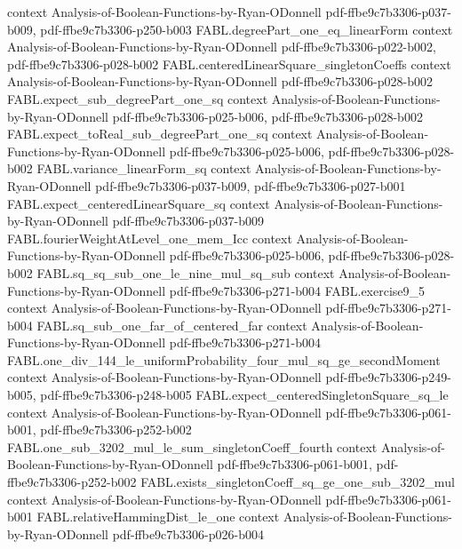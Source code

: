 \begin{theorem}
  {context}
  {Analysis-of-Boolean-Functions-by-Ryan-ODonnell}
  {pdf-ffbe9c7b3306-p037-b009,
    pdf-ffbe9c7b3306-p250-b003}
\proofstep
  {FABL.degreePart_one_eq_linearForm}
  {context}
  {Analysis-of-Boolean-Functions-by-Ryan-ODonnell}
  {pdf-ffbe9c7b3306-p022-b002,
    pdf-ffbe9c7b3306-p028-b002}
\proofstep
  {FABL.centeredLinearSquare_singletonCoeffs}
  {context}
  {Analysis-of-Boolean-Functions-by-Ryan-ODonnell}
  {pdf-ffbe9c7b3306-p028-b002}
\proofstep
  {FABL.expect_sub_degreePart_one_sq}
  {context}
  {Analysis-of-Boolean-Functions-by-Ryan-ODonnell}
  {pdf-ffbe9c7b3306-p025-b006,
    pdf-ffbe9c7b3306-p028-b002}
\proofstep
  {FABL.expect_toReal_sub_degreePart_one_sq}
  {context}
  {Analysis-of-Boolean-Functions-by-Ryan-ODonnell}
  {pdf-ffbe9c7b3306-p025-b006,
    pdf-ffbe9c7b3306-p028-b002}
\proofstep
  {FABL.variance_linearForm_sq}
  {context}
  {Analysis-of-Boolean-Functions-by-Ryan-ODonnell}
  {pdf-ffbe9c7b3306-p037-b009,
    pdf-ffbe9c7b3306-p027-b001}
\proofstep
  {FABL.expect_centeredLinearSquare_sq}
  {context}
  {Analysis-of-Boolean-Functions-by-Ryan-ODonnell}
  {pdf-ffbe9c7b3306-p037-b009}
\proofstep
  {FABL.fourierWeightAtLevel_one_mem_Icc}
  {context}
  {Analysis-of-Boolean-Functions-by-Ryan-ODonnell}
  {pdf-ffbe9c7b3306-p025-b006,
    pdf-ffbe9c7b3306-p028-b002}
\proofstep
  {FABL.sq_sq_sub_one_le_nine_mul_sq_sub}
  {context}
  {Analysis-of-Boolean-Functions-by-Ryan-ODonnell}
  {pdf-ffbe9c7b3306-p271-b004}
\proofstep
  {FABL.exercise9_5}
  {context}
  {Analysis-of-Boolean-Functions-by-Ryan-ODonnell}
  {pdf-ffbe9c7b3306-p271-b004}
\proofstep
  {FABL.sq_sub_one_far_of_centered_far}
  {context}
  {Analysis-of-Boolean-Functions-by-Ryan-ODonnell}
  {pdf-ffbe9c7b3306-p271-b004}
\proofstep
  {FABL.one_div_144_le_uniformProbability_four_mul_sq_ge_secondMoment}
  {context}
  {Analysis-of-Boolean-Functions-by-Ryan-ODonnell}
  {pdf-ffbe9c7b3306-p249-b005,
    pdf-ffbe9c7b3306-p248-b005}
\proofstep
  {FABL.expect_centeredSingletonSquare_sq_le}
  {context}
  {Analysis-of-Boolean-Functions-by-Ryan-ODonnell}
  {pdf-ffbe9c7b3306-p061-b001,
    pdf-ffbe9c7b3306-p252-b002}
\proofstep
  {FABL.one_sub_3202_mul_le_sum_singletonCoeff_fourth}
  {context}
  {Analysis-of-Boolean-Functions-by-Ryan-ODonnell}
  {pdf-ffbe9c7b3306-p061-b001,
    pdf-ffbe9c7b3306-p252-b002}
\proofstep
  {FABL.exists_singletonCoeff_sq_ge_one_sub_3202_mul}
  {context}
  {Analysis-of-Boolean-Functions-by-Ryan-ODonnell}
  {pdf-ffbe9c7b3306-p061-b001}
\proofstep
  {FABL.relativeHammingDist_le_one}
  {context}
  {Analysis-of-Boolean-Functions-by-Ryan-ODonnell}
  {pdf-ffbe9c7b3306-p026-b004}

\end{theorem}
